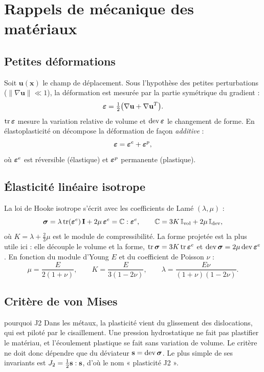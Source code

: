\section{Rappels de mécanique des matériaux}\label{sec:meca}

\subsection{Petites déformations}

Soit $\mathbf{u}(\mathbf{x})$ le champ de déplacement. Sous l'hypothèse des petites perturbations ($\|\nabla\mathbf{u}\|\ll1$), la déformation est mesurée par la partie symétrique du gradient :
\begin{equation}
\boldsymbol{\varepsilon} = \tfrac12\big(\nabla\mathbf{u}+\nabla\mathbf{u}^T\big).
\end{equation}
$\operatorname{tr}\boldsymbol{\varepsilon}$ mesure la variation relative de volume et $\operatorname{dev}\boldsymbol{\varepsilon}$ le changement de forme. En élastoplasticité on décompose la déformation de façon \emph{additive} :
\begin{equation}
\boldsymbol{\varepsilon} = \boldsymbol{\varepsilon}^e + \boldsymbol{\varepsilon}^{p} ,
\end{equation}
où $\boldsymbol{\varepsilon}^e$ est réversible (élastique) et $\boldsymbol{\varepsilon}^{p}$ permanente (plastique).

\subsection{Élasticité linéaire isotrope}

La loi de Hooke isotrope s'écrit avec les coefficients de Lamé $(\lambda,\mu)$ :
\begin{equation}
\boldsymbol{\sigma} = \lambda\operatorname{tr}(\boldsymbol{\varepsilon}^e)\,\mathbf{I} + 2\mu\,\boldsymbol{\varepsilon}^e = \mathbb{C}:\boldsymbol{\varepsilon}^e,\qquad \mathbb{C} = 3K\,\mathbb{I}_{\mathrm{vol}} + 2\mu\,\mathbb{I}_{\mathrm{dev}},
\label{eq:hooke}
\end{equation}
où $K=\lambda+\frac23\mu$ est le module de compressibilité. La forme projetée est la plus utile ici : elle découple le volume et la forme, $\operatorname{tr}\boldsymbol{\sigma} = 3K\operatorname{tr}\boldsymbol{\varepsilon}^e$ et $\operatorname{dev}\boldsymbol{\sigma} = 2\mu\operatorname{dev}\boldsymbol{\varepsilon}^e$. En fonction du module d'Young $E$ et du coefficient de Poisson $\nu$ :
\[
\mu = \frac{E}{2(1+\nu)},\qquad K = \frac{E}{3(1-2\nu)},\qquad \lambda = \frac{E\nu}{(1+\nu)(1-2\nu)}.
\]

\subsection{Critère de von Mises}

\begin{rappel}{pourquoi J2}
Dans les métaux, la plasticité vient du glissement des dislocations, qui est piloté par le cisaillement. Une pression hydrostatique ne fait pas plastifier le matériau, et l'écoulement plastique se fait sans variation de volume. Le critère ne doit donc dépendre que du déviateur $\mathbf{s}=\operatorname{dev}\boldsymbol{\sigma}$. Le plus simple de ses invariants est $J_2 = \frac12\mathbf{s}:\mathbf{s}$, d'où le nom « plasticité J2 ».
\end{rappel}

